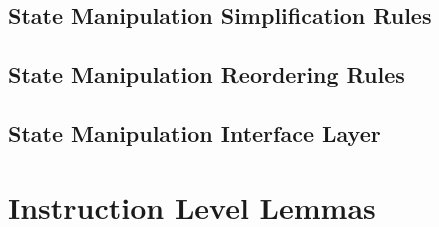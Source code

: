 \documentclass[11pt,a4paper]{article}
\begin{document}
\subsection{State Manipulation Simplification Rules}









\subsection{State Manipulation Reordering Rules}




\subsection{State Manipulation Interface Layer}


\section{Instruction Level Lemmas}

\end{document}
